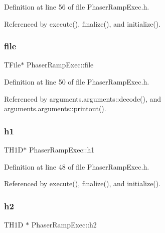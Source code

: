 Definition at line 56 of file Phaser\+Ramp\+Exec.\+h.



Referenced by execute(), finalize(), and initialize().

\mbox{\label{classPhaserRampExec_a63092bcbec01af94b4c5c842b81d2ccf}} 
\subsubsection{\texorpdfstring{file}{file}}
{\footnotesize\ttfamily T\+File$\ast$ Phaser\+Ramp\+Exec\+::file\hspace{0.3cm}{\ttfamily [private]}}



Definition at line 50 of file Phaser\+Ramp\+Exec.\+h.



Referenced by arguments.\+arguments\+::decode(), and arguments.\+arguments\+::printout().

\mbox{\label{classPhaserRampExec_a8c13c96564df17be4e71685684e67edd}} 
\subsubsection{\texorpdfstring{h1}{h1}}
{\footnotesize\ttfamily T\+H1D$\ast$ Phaser\+Ramp\+Exec\+::h1\hspace{0.3cm}{\ttfamily [private]}}



Definition at line 48 of file Phaser\+Ramp\+Exec.\+h.



Referenced by execute(), finalize(), and initialize().

\mbox{\label{classPhaserRampExec_a538d1b02ed14d13c71f54b2b48e765ba}} 
\subsubsection{\texorpdfstring{h2}{h2}}
{\footnotesize\ttfamily T\+H1D $\ast$ Phaser\+Ramp\+Exec\+::h2\hspace{0.3cm}{\ttfamily [private]}}



